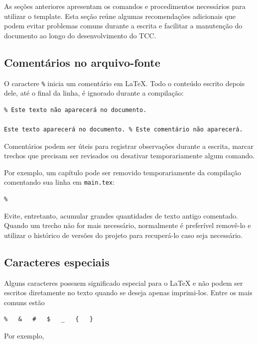 As seções anteriores apresentam os comandos e procedimentos necessários para utilizar o template. Esta seção reúne algumas recomendações adicionais que podem evitar problemas comuns durante a escrita e facilitar a manutenção do documento ao longo do desenvolvimento do TCC.

\subsection{Comentários no arquivo-fonte}
\label{ssec:comentarios_codigo}

O caractere \verb|%| inicia um comentário em LaTeX. Todo o conteúdo escrito depois dele, até o final da linha, é ignorado durante a compilação:

\begin{verbatim}
% Este texto não aparecerá no documento.

Este texto aparecerá no documento. % Este comentário não aparecerá.
\end{verbatim}

Comentários podem ser úteis para registrar observações durante a escrita, marcar trechos que precisam ser revisados ou desativar temporariamente algum comando.

Por exemplo, um capítulo pode ser removido temporariamente da compilação comentando sua linha em \verb|main.tex|:

\begin{verbatim}
% 
\end{verbatim}

Evite, entretanto, acumular grandes quantidades de texto antigo comentado. Quando um trecho não for mais necessário, normalmente é preferível removê-lo e utilizar o histórico de versões do projeto para recuperá-lo caso seja necessário.

\subsection{Caracteres especiais}
\label{ssec:caracteres_especiais}

Alguns caracteres possuem significado especial para o LaTeX e não podem ser escritos diretamente no texto quando se deseja apenas imprimi-los. Entre os mais comuns estão

\begin{verbatim}
%   &   #   $   _   {   }
\end{verbatim}

Por exemplo,

